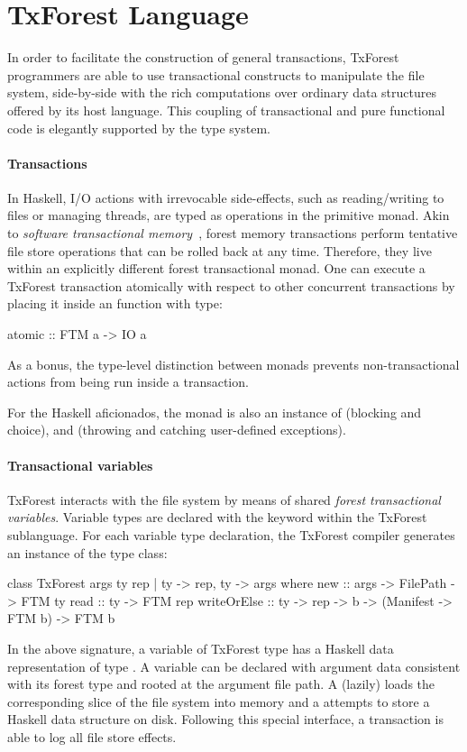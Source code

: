 
\section{TxForest Language}
\label{sec:txforest}

In order to facilitate the construction of general transactions, TxForest programmers are able to use transactional constructs to manipulate the file system, side-by-side with the rich computations over ordinary data structures offered by its host language.
This coupling of transactional and pure functional code is elegantly supported by the type system.

\paragraph{Transactions}
In Haskell, I/O actions with irrevocable side-effects, such as reading/writing to files or managing threads, are typed as operations in the primitive  monad.
Akin to \emph{software transactional memory}~\cite{HaskellSTM}, forest memory transactions perform tentative file store operations that can be rolled  back at any time. Therefore, they live within an explicitly different  forest transactional monad.
One can execute a TxForest transaction atomically with respect to other concurrent transactions by placing it inside an  function with type:
\begin{code}
atomic :: FTM a -> IO a
\end{code}
As a bonus, the type-level distinction between monads prevents non-transactional actions from being run inside a transaction.

For the Haskell aficionados, the  monad is also an instance of  (blocking and choice),  and  (throwing and catching user-defined exceptions).

\paragraph{Transactional variables}
TxForest interacts with the file system by means of shared \emph{forest transactional variables}. Variable types are declared with the  keyword within the TxForest sublanguage. For each variable type declaration, the TxForest compiler generates an instance of the  type class:
\begin{code}
class TxForest args ty rep | ty -> rep, ty -> args where
  new         :: args -> FilePath -> FTM ty
  read        :: ty -> FTM rep
  writeOrElse :: ty -> rep -> b
              -> (Manifest -> FTM b) -> FTM b
\end{code}
In the above signature, a variable of TxForest type  has a Haskell data representation of type . A  variable can be declared with argument data consistent with its forest type and rooted at the argument file path. A  (lazily) loads the corresponding slice of the file system into memory and a  attempts to store a Haskell data structure on disk.
Following this special interface, a transaction is able to log all file store effects.

